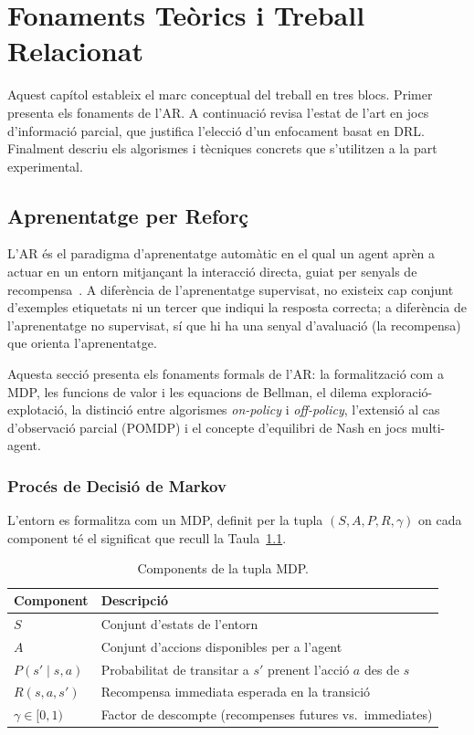 ﻿%

\chapter{Fonaments Teòrics i Treball Relacionat}
\label{cap:marc}

Aquest capítol estableix el marc conceptual del treball en tres blocs. Primer
presenta els fonaments de l'\ac{AR}. A continuació revisa l'estat de l'art en
jocs d'informació parcial, que justifica l'elecció d'un enfocament basat en
\ac{DRL}. Finalment descriu els algorismes i tècniques concrets que s'utilitzen
a la part experimental.

\section{Aprenentatge per Reforç}
\label{sec:ar}

L'\ac{AR} és el paradigma d'aprenentatge automàtic en el qual un agent aprèn
a actuar en un entorn mitjançant la interacció directa, guiat per senyals de
recompensa~\cite{sutton2018}. A diferència de l'aprenentatge supervisat, no
existeix cap conjunt d'exemples etiquetats ni un tercer que indiqui la
resposta correcta; a diferència de l'aprenentatge no supervisat, sí que hi ha
una senyal d'avaluació (la recompensa) que orienta l'aprenentatge.

Aquesta secció presenta els fonaments formals de l'\ac{AR}: la formalització
com a \acs{MDP}, les funcions de valor i les equacions de Bellman, el dilema
exploració-explotació, la distinció entre algorismes \emph{on-policy} i
\emph{off-policy}, l'extensió al cas d'observació parcial (\ac{POMDP}) i el
concepte d'equilibri de Nash en jocs multi-agent.

\subsection*{Procés de Decisió de Markov}

L'entorn es formalitza com un \acf{MDP}, definit per la tupla
$(S, A, P, R, \gamma)$ on cada component té el significat que recull la
Taula~\ref{tab:mdp-tuple}.

\begin{table}[H]
  \centering
  \begin{tabular}{ll}
    \toprule
    Component & Descripció \\
    \midrule
    $S$ & Conjunt d'estats de l'entorn \\
    $A$ & Conjunt d'accions disponibles per a l'agent \\
    $P(s' \mid s, a)$ & Probabilitat de transitar a $s'$ prenent l'acció $a$ des de $s$ \\
    $R(s, a, s')$ & Recompensa immediata esperada en la transició \\
    $\gamma \in [0,1)$ & Factor de descompte (recompenses futures vs.\ immediates) \\
    \bottomrule
  \end{tabular}
  \caption{Components de la tupla \acs{MDP}.}
  \label{tab:mdp-tuple}
\end{table}


